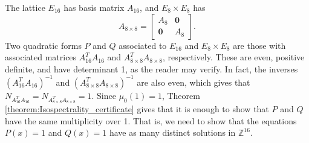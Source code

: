 \documentclass{amsart}
\theoremstyle{definition}
\newcommand*{\Z}{\mathbb{Z}}
\begin{document}
The lattice $E_{16}$ has basis matrix $A_{16}$, and $E_8 \times E_8$ has
\begin{equation*}
    A_{8 \times 8} =
    \begin{bmatrix}
        A_8 & \bm{0} \\
        \bm{0} & A_8
    \end{bmatrix}.
\end{equation*}
Two quadratic forms $P$ and $Q$ associated to $E_{16}$ and $E_8 \times E_8$ are those with associated matrices $A_{16}^TA_{16}$ and $A_{8 \times 8}^TA_{8 \times 8}$, respectively. These are even, positive definite, and have determinant 1, as the reader may verify. In fact, the inverses $(A_{16}^TA_{16})^{-1}$ and $(A_{8 \times 8}^TA_{8 \times 8})^{-1}$ are also even, which gives that $N_{A_{16}^TA_{16}} = N_{A_{8 \times 8}^TA_{8 \times 8}} = 1$. Since $\mu_0(1) = 1$, Theorem \ref{theorem:Isospectrality_certificate} gives that it is enough to show that $P$ and $Q$ have the same multiplicity over 1. That is, we need to show that the equations $P(x) = 1$ and $Q(x) = 1$ have as many distinct solutions in $\Z^{16}$.
\end{document}

